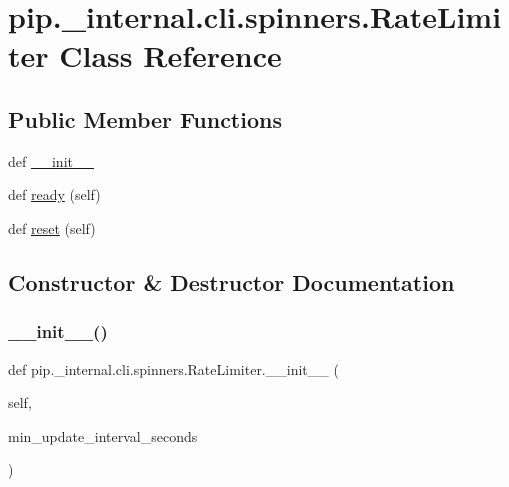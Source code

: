 \hypertarget{classpip_1_1__internal_1_1cli_1_1spinners_1_1RateLimiter}{}\section{pip.\+\_\+internal.\+cli.\+spinners.\+Rate\+Limiter Class Reference}
\label{classpip_1_1__internal_1_1cli_1_1spinners_1_1RateLimiter}
\subsection*{Public Member Functions}
\begin{DoxyCompactItemize}
\item 
def \hyperlink{classpip_1_1__internal_1_1cli_1_1spinners_1_1RateLimiter_a3f3ac5f152625716e3e3442e92f41763}{\+\_\+\+\_\+init\+\_\+\+\_\+}
\item 
def \hyperlink{classpip_1_1__internal_1_1cli_1_1spinners_1_1RateLimiter_a3125ca9ea66d9e78a90d6fe539b3cfd1}{ready} (self)
\item 
def \hyperlink{classpip_1_1__internal_1_1cli_1_1spinners_1_1RateLimiter_aae61e52bce01ef598f6fb5be40bcce50}{reset} (self)
\end{DoxyCompactItemize}


\subsection{Constructor \& Destructor Documentation}
\mbox{\label{classpip_1_1__internal_1_1cli_1_1spinners_1_1RateLimiter_a3f3ac5f152625716e3e3442e92f41763}} 
\subsubsection{\texorpdfstring{\+\_\+\+\_\+init\+\_\+\+\_\+()}{\_\_init\_\_()}}
{\footnotesize\ttfamily def pip.\+\_\+internal.\+cli.\+spinners.\+Rate\+Limiter.\+\_\+\+\_\+init\+\_\+\+\_\+ (\begin{DoxyParamCaption}\item[{}]{self,  }\item[{}]{min\+\_\+update\+\_\+interval\+\_\+seconds }\end{DoxyParamCaption})}



